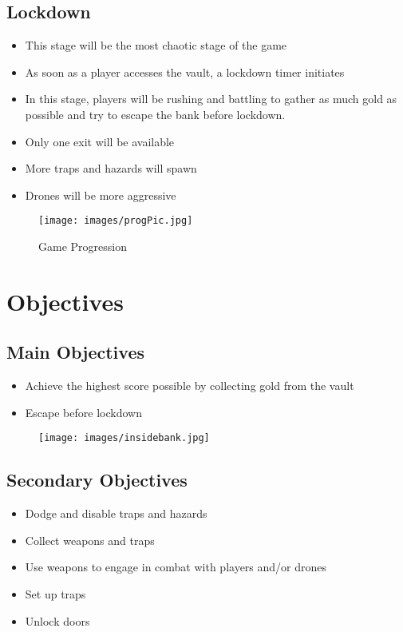 \documentclass[10pt]{report}
\begin{document}
\subsection{Lockdown}

\begin{itemize}
    \item This stage will be the most chaotic stage of the game
    \item As soon as a player accesses the vault, a lockdown timer initiates
    \item In this stage, players will be rushing and battling to gather as much gold as possible and try to escape the bank before lockdown.
    \item Only one exit will be available
    \item More traps and hazards will spawn
    \item Drones will be more aggressive
\end{itemize}

\begin{figure}[H]
    \centering
    \texttt{[image: images/progPic.jpg]}
    \caption{Game Progression}
\end{figure}

\section{Objectives}

\subsection{Main Objectives}

\begin{itemize}
    \item Achieve the highest score possible by collecting gold from the vault
    \item Escape before lockdown
\end{itemize}

\begin{figure}[H]
    \centering
    \texttt{[image: images/insidebank.jpg]}
    \caption{}
\end{figure}

\subsection{Secondary Objectives}

\begin{itemize}
    \item Dodge and disable traps and hazards
    \item Collect weapons and traps
    \item Use weapons to engage in combat with players and/or drones
    \item Set up traps
    \item Unlock doors
\end{itemize}
\end{document}
